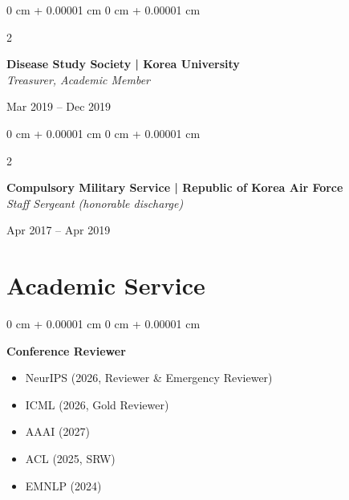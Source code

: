 \documentclass[11pt, letterpaper]{article}
\newenvironment{highlights}{
    \begin{itemize}[
        topsep=0.10 cm,
        parsep=0.10 cm,
        partopsep=0pt,
        itemsep=0pt,
        leftmargin=0 cm + 10pt
    ]
}{
    \end{itemize}
} %
\newenvironment{onecolentry}{
    \Needspace{3\baselineskip}
    \begin{adjustwidth}{
        0 cm + 0.00001 cm
    }{
        0 cm + 0.00001 cm
    }
}{
    \end{adjustwidth}
} %
\newenvironment{twocolentry}[2][]{
    \onecolentry
    \def\secondColumn{#2}
    \setcolumnwidth{\fill, 4.8 cm}
    \begin{paracol}{2}
}{
    \switchcolumn \raggedleft \secondColumn
    \end{paracol}
    \endonecolentry
} %
\begin{document}
        \begin{twocolentry}{
            Mar 2019 -- Dec 2019\\ 
        }
        \textbf{Disease Study Society | Korea University}\\
\textit{Treasurer, Academic Member}
        \end{twocolentry}
         \vspace{0.15 cm}
        \begin{twocolentry}{
            Apr 2017 -- Apr 2019\\ 
        }
        \textbf{Compulsory Military Service | Republic of Korea Air Force}\\
        \textit{Staff Sergeant (honorable discharge)}
        \end{twocolentry}
            \vspace{0.15 cm}

\section{Academic Service}

\begin{onecolentry}
    \textbf{Conference Reviewer}
    \begin{highlights}
        \item NeurIPS (2026, Reviewer \& Emergency Reviewer)
        \item ICML (2026, Gold Reviewer)
        \item AAAI (2027)
        \item ACL (2025, SRW)
        \item EMNLP (2024)
    \end{highlights}
\end{onecolentry}
\vspace{0.2 cm}
\end{document}
